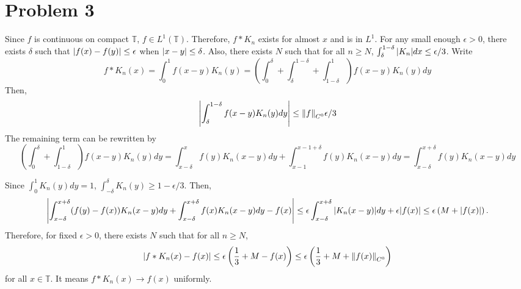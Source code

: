 \documentclass{article}
\begin{document}
\section*{Problem 3}
Since $f$ is continuous on compact $\mathbb{T}$, $f\in L^1(\mathbb{T})$. Therefore, $f* K_n$ exists for almost $x$ and is in $L^1$. For any small enough $\epsilon>0$, there exists $\delta$ such that $\abs{f(x)-f(y)}\leq \epsilon$ when $\abs{x-y}\leq \delta$. Also, there exists $N$ such that for all $n\geq N$, $\int_\delta^{1-\delta} \abs{K_n}dx\leq \epsilon/3$. Write
\begin{equation*}
f * K_n(x)=\int_0^1 f(x-y)K_n(y) = \left(\int_0^\delta + \int_\delta^{1-\delta} + \int_{1-\delta}^1\right) f(x-y)K_n(y) dy
\end{equation*}
Then,
\begin{equation*}
\abs{\int_\delta^{1-\delta}f(x-y)K_n(y) dy}\leq \norm{f}_{C^0}\epsilon/3
\end{equation*}
The remaining term can be rewritten by
\begin{equation*}
\left(\int_0^\delta + \int_{1-\delta}^1\right) f(x-y)K_n(y) dy = \int_{x-\delta}^x f(y) K_n(x-y) dy +\int_{x-1}^{x-1+\delta} f(y) K_n(x-y)dy = \int_{x-\delta}^{x+\delta} f(y) K_n(x-y) dy
\end{equation*}

Since $\int_0^1 K_n(y)dy=1$, $\int_{-\delta}^{\delta} K_n(y)\geq 1-\epsilon/3$. Then,
\begin{equation*}
\abs{\int_{x-\delta}^{x+\delta} (f(y)-f(x)) K_n(x-y) dy + \int_{x-\delta}^{x+\delta}f(x)K_n(x-y) dy - f(x)} \leq \epsilon \int_{x-\delta}^{x+\delta} \abs{K_n(x-y)} dy + \epsilon \abs{f(x)} \leq \epsilon \left(M +\abs{f(x)}\right).
\end{equation*}
Therefore, for fixed $\epsilon>0$, there exists $N$ such that for all $n\geq N$,
\begin{equation*}
\abs{f*K_n(x)-f(x)}\leq \epsilon\left(\frac{1}{3}+M-f(x)\right)\leq  \epsilon\left(\frac{1}{3}+M+\norm{f(x)}_{C^0}\right)
\end{equation*}
for all $x\in \mathbb{T}$. It means $f*K_n(x)\rightarrow f(x)$ uniformly.
\end{document}

